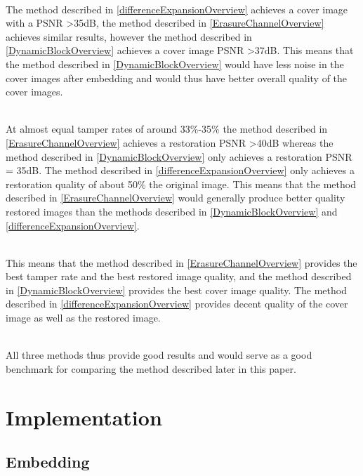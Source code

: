 \documentclass[12pt]{article}
\begin{document}
\hspace{0pt} \\
The method described in \ref{differenceExpansionOverview} achieves a cover image with a PSNR \textgreater 35dB, the method described in \ref{ErasureChannelOverview} achieves similar results, however the method described in \ref{DynamicBlockOverview} achieves a cover image PSNR \textgreater 37dB.
This means that the method described in \ref{DynamicBlockOverview} would have less noise in the cover images after embedding and would thus have better overall quality of the cover images.

\hspace{0pt} \\
At almost equal tamper rates of around 33\%-35\% the method described in \ref{ErasureChannelOverview} achieves a restoration PSNR \textgreater 40dB whereas the method described in \ref{DynamicBlockOverview} only achieves a restoration PSNR = 35dB.
The method described in \ref{differenceExpansionOverview} only achieves a restoration quality of about 50\% the original image.
This means that the method described in \ref{ErasureChannelOverview} would generally produce better quality restored images than the methods described in \ref{DynamicBlockOverview} and \ref{differenceExpansionOverview}.

\hspace{0pt} \\
This means that the method described in \ref{ErasureChannelOverview} provides the best tamper rate and the best restored image quality, and the method described in \ref{DynamicBlockOverview} provides the best cover image quality.
The method described in \ref{differenceExpansionOverview} provides decent quality of the cover image as well as the restored image.

\hspace{0pt} \\
All three methods thus provide good results and would serve as a good benchmark for comparing the method described later in this paper.

\section{Implementation}
\label{Implementation}

\subsection{Embedding}
\label{embedding}
\end{document}
